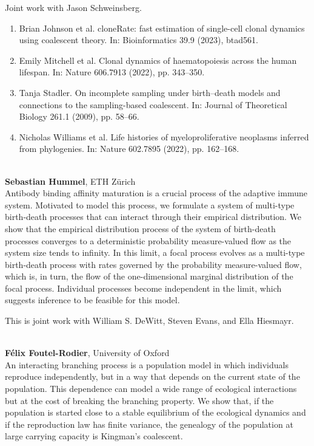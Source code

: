 \documentclass[12pt,a4paper]{article}
\begin{document}
 Joint work with Jason Schweinsberg. 

 \begin{enumerate} \item Brian Johnson et al. cloneRate: fast estimation of single-cell clonal dynamics using coalescent theory. In: Bioinformatics 39.9 (2023), btad561. \item Emily Mitchell et al. Clonal dynamics of haematopoiesis across the human lifespan. In: Nature 606.7913 (2022), pp. 343–350. \item Tanja Stadler. On incomplete sampling under birth–death models and connections to the sampling-based coalescent. In: Journal of Theoretical Biology 261.1 (2009), pp. 58–66. \item Nicholas Williams et al. Life histories of myeloproliferative neoplasms inferred from phylogenies. In: Nature 602.7895 (2022), pp. 162–168. \end{enumerate} 

\bigskip\bigskip

\\[1ex]{ \large \textbf{ Sebastian Hummel}}, ETH Zürich \\[2ex] Antibody binding affinity maturation is a crucial process of the adaptive immune system. Motivated to model this process, we formulate a system of multi-type birth-death processes that can interact through their empirical distribution. We show that the empirical distribution process of the system of birth-death processes converges to a deterministic probability measure-valued flow as the system size tends to infinity. In this limit, a focal process evolves as a multi-type birth-death process with rates governed by the probability measure-valued flow, which is, in turn, the flow of the one-dimensional marginal distribution of the focal process. Individual processes become independent in the limit, which suggests inference to be feasible for this model. 

 This is joint work with William S. DeWitt, Steven Evans, and Ella Hiesmayr. 

\bigskip\bigskip

\\[1ex]{ \large \textbf{ Félix Foutel-Rodier}}, University of Oxford \\[2ex] An interacting branching process is a population model in which individuals reproduce independently, but in a way that depends on the current state of the population. This dependence can model a wide range of ecological interactions but at the cost of breaking the branching property. We show that, if the population is started close to a stable equilibrium of the ecological dynamics and if the reproduction law has finite variance, the genealogy of the population at large carrying capacity is Kingman's coalescent. 
\end{document}
